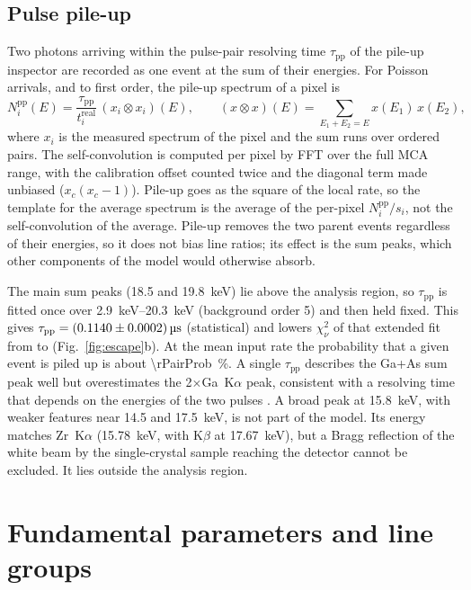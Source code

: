 \documentclass[11pt,a4paper]{article}
\begin{document}
\subsection{Pulse pile-up}\label{sec:pileup}
Two photons arriving within the pulse-pair resolving time $\tau_\mathrm{pp}$ of the pile-up inspector
are recorded as one event at the sum of their energies. For Poisson arrivals, and to first order, the
pile-up spectrum of a pixel is \citep{Statham1977}
\begin{equation}
N^\mathrm{pp}_{i}(E) = \frac{\tau_\mathrm{pp}}{t_i^\mathrm{real}}\,(x_i\otimes x_i)(E),\qquad
(x\otimes x)(E) = \sum_{E_1+E_2=E} x(E_1)\,x(E_2),
\label{eq:pileup}
\end{equation}
where $x_i$ is the measured spectrum of the pixel and the sum runs over ordered pairs. The
self-convolution is computed per pixel by FFT over the full MCA range, with the calibration
offset counted twice and the diagonal term made unbiased ($x_c(x_c-1)$). Pile-up goes as the square of
the local rate, so the template for the average spectrum is the average of the per-pixel
$N^\mathrm{pp}_i/s_i$, not the self-convolution of the average. Pile-up removes the two parent events
regardless of their energies, so it does not bias line ratios; its effect is the sum peaks, which other
components of the model would otherwise absorb.

The main sum peaks (\num{18.5} and \qty{19.8}{keV}) lie above the analysis region, so
$\tau_\mathrm{pp}$ is fitted once over \qtyrange{2.9}{20.3}{keV} (background order 5) and then held
fixed. This gives $\tau_\mathrm{pp} = \qty{0.114\pm0.0002}{\micro\second}$ (statistical) and lowers
$\chi^2_\nu$ of that extended fit from \rTauChiWithout{} to \rTauChiWith{} (Fig.~\ref{fig:escape}b).
At the mean input rate the probability that a given event is piled up is about
\qty{\rPairProb}{\percent}. A single $\tau_\mathrm{pp}$ describes the Ga+As sum peak well but
overestimates the 2$\times$Ga~K$\alpha$ peak, consistent with a resolving time that depends on the
energies of the two pulses \citep{Statham1977}. A broad peak at \qty{15.8}{keV}, with weaker features
near \num{14.5} and \qty{17.5}{keV}, is not part of the model. Its energy matches Zr~K$\alpha$
(\qty{15.78}{keV}, with K$\beta$ at \qty{17.67}{keV}), but a Bragg reflection of the white beam by the
single-crystal sample reaching the detector cannot be excluded. It lies outside the analysis region.

\section{Fundamental parameters and line groups}\label{sec:fp}
\end{document}
